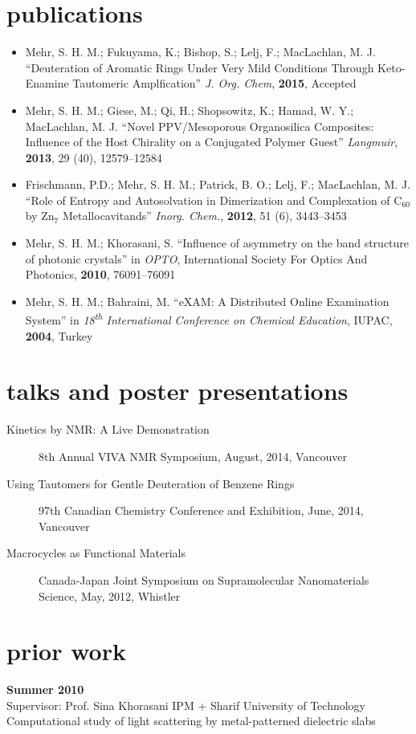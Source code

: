 \documentclass[overlapped,line,10pt,letterpaper]{res}
\begin{document}
\begin{resume}
\section{publications}
\begin{itemize}
\renewcommand{\labelitemi}{$\bullet$}
\item Mehr, S. H. M.; Fukuyama, K.; Bishop, S.; Lelj, F.; MacLachlan, M. J. ``Deuteration of Aromatic Rings Under Very Mild Conditions Through Keto-Enamine  Tautomeric Amplfication'' \emph{J. Org. Chem}, \textbf{2015}, Accepted
\item  Mehr, S. H. M.; Giese, M.; Qi, H.; Shopsowitz, K.; Hamad, W. Y.; MacLachlan, M. J. ``Novel PPV/Mesoporous Organosilica Composites: Influence of the Host Chirality on a Conjugated Polymer Guest'' \emph{Langmuir}, \textbf{2013}, 29 (40), 12579–12584
\item Frischmann, P.D.; Mehr, S. H. M.; Patrick, B. O.; Lelj, F.; MacLachlan, M. J. ``Role of Entropy and Autosolvation in Dimerization and Complexation of $\mathrm{C_{60}}$ by $\mathrm{Zn_7}$ Metallocavitands'' \emph{Inorg. Chem.}, \textbf{2012}, 51 (6), 3443–3453
\item Mehr, S. H. M.; Khorasani, S. ``Influence of asymmetry on the band structure of photonic crystals'' in \emph{OPTO}, International Society For Optics And Photonics, \textbf{2010}, 76091–76091
\item Mehr, S. H. M.; Bahraini, M. ``eXAM: A Distributed Online Examination System'' in \emph{18\textsuperscript{th} International Conference on Chemical Education}, IUPAC, \textbf{2004}, Turkey
\end{itemize}

\section{talks and poster presentations}
\begin{description}
\item[Kinetics by NMR: A Live Demonstration] 8th Annual VIVA NMR Symposium, August, 2014, Vancouver
\item[Using Tautomers for Gentle Deuteration of Benzene Rings] 97th Canadian Chemistry Conference and Exhibition, June, 2014, Vancouver
\item[Macrocycles as Functional Materials] Canada-Japan Joint Symposium on Supramolecular Nanomaterials Science, May, 2012, Whistler
\end{description}

\section{prior work}
\textbf{Summer 2010} \\
Supervisor: Prof. Sina Khorasani \hspace{\fill} IPM + Sharif University of Technology \\
Computational study of light scattering by metal-patterned dielectric slabs


\end{resume}
\end{document}
